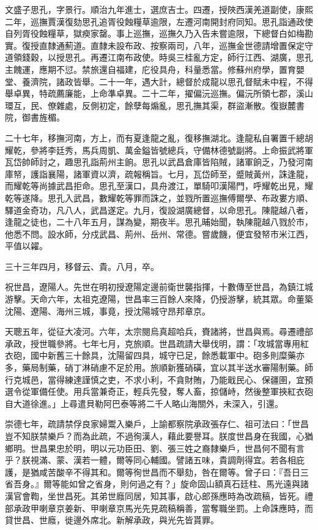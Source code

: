 \begin{pinyinscope}
文盛子思孔，字景行。順治九年進士，選庶吉士。四遷，授陜西漢羌道副使，康熙二年，巡撫賈漢復劾思孔追胥役蝕糧草逾限，左遷河南開封府同知。思孔詣通政使自列胥役蝕糧草，獄瘐家罄。事上巡撫，巡撫久乃入告未嘗逾限，下總督白如梅勘實。復授直隸通薊道。直隸未設布政、按察兩司，八年，巡撫金世德請增置保定守道領錢穀，以授思孔。再遷江南布政使。時吳三桂亂方定，師行江西、湖廣，思孔主餽運，應期不愆。禁旅還自福建，庀役具舟，科量悉當。修蘇州府學，置育嬰堂、養濟院，諸政皆舉。二十一年，遇大計，總督於成龍以思孔督賦未中程，不得舉卓異，特疏薦廉能，上命準卓異。二十二年，擢偏沅巡撫。偏沅所領七郡，溪山環互，民、僚雜處，反側初定，餘孽每煽亂，思孔撫其渠，群盜漸散。復嶽麓書院，御書旌楣。

二十七年，移撫河南，方上，而有夏逢龍之亂，復移撫湖北。逢龍私自署置千總胡耀乾，參將李廷秀，馬兵周凱、萬金鎰皆號總兵，守備林德號副將。上命振武將軍瓦岱帥師討之，趣思孔詣荊州主餉。思孔以武昌倉庫皆陷賊，諸軍餉乏，乃發河南庫帑，護詣襄陽，諸軍資以濟，疏報稱旨。七月，瓦岱師至，蹙賊黃州，誅逢龍，而耀乾等尚據武昌拒命。思孔至漢口，具舟渡江，單騎叩漢陽門，呼耀乾出見，耀乾等遂降。思孔入武昌，數耀乾等罪而誅之，並戮所置巡撫傅爾學、布政婁方順、驛道金奇功，凡八人，武昌遂定。九月，復設湖廣總督，以命思孔。陳龍越八者，逢龍之徒也，二十八年五月，謀為變，期夜半。思孔晡始聞，執陳龍越八戮於市，他悉不問。設水師，分戍武昌、荊州、岳州、常德。嘗歲饑，便宜發帑市米江西，平值以糴。

三十三年四月，移督云、貴。八月，卒。

祝世昌，遼陽人。先世在明初授遼陽定邊前衛世襲指揮，十數傳至世昌，為鎮江城游擊。天命六年，太祖克遼陽，世昌率三百餘人來降，仍授游擊，統其眾。命董築沈陽、遼陽、海州三城，事竟，授沈陽城守昂邦章京。

天聰五年，從征大凌河。六年，太宗閱烏真超哈兵，賚諸將，世昌與焉。尋遷禮部承政，授世職參將。七年七月，克旅順。世昌疏請大舉伐明，謂：「攻城當專用紅衣砲，國中新舊三十餘具，沈陽留四具，城守已足，餘悉載軍中。砲多則糜藥亦多，藥局制藥，硝丁淋硝慮不足於用。旅順新獲硝磺，宜以其半送水審陽制藥。師行克城邑，當得練達謹慎之吏，不求小利，不貪財賄，乃能戢民心、保疆圉，宜預選令從軍備任使。用兵當兼奇正，輕兵先發，奪人畜，掠儲峙，然後整軍挾紅衣砲自大道徐進。」上尋遣貝勒阿巴泰等將二千人略山海關外，未深入，引還。

崇德七年，疏請禁俘良家婦鬻入樂戶，上諭都察院承政張存仁、祖可法曰：「世昌豈不知朕禁樂戶？而為此疏，不過徇漢人，藉此要譽耳。朕度世昌身在我國，心猶鄉明。世昌果忠於明，明以元功臣田、劉、張三姓之裔隸樂戶，世昌何不聞有言乎？朕視滿、蒙、漢若一體，爾等同心輔國。譬諸五味，貴調劑得宜。若各相庇護，是猶咸苦酸辛不得其和。爾等徇世昌而不舉劾，咎在爾等。曾子曰：『吾日三省吾身。』爾等能如曾之省身，則何過之有？」旋命固山額真石廷柱、馬光遠與諸漢官會鞫，坐世昌死。其弟世廕同居，知其事，啟心郎孫應時為改疏稿，皆死。禮部承政甲喇章京姜新、甲喇章京馬光先見疏稿稱善，當奪職坐罰。上命誅應時，而貸世昌、世廕，徙邊外席北。新解承政，與光先皆貰罪。


\end{pinyinscope}
